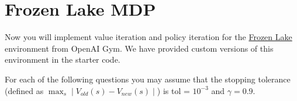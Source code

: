 \section{Frozen Lake MDP}

Now you will implement value iteration and policy iteration for the  \href{https://www.gymlibrary.dev/environments/toy_text/frozen_lake/}{Frozen Lake} environment
from OpenAI Gym. We have provided
custom versions of this environment in the starter code.

For each of the following questions you may assume that the stopping tolerance (defined as $\max_s \mid V_{old}(s) - V_{new}(s) \mid $) is tol = $10^{-3}$ and $\gamma = 0.9$.

\begin{enumerate}[(a)]

	

	

	

	

	

\end{enumerate}
